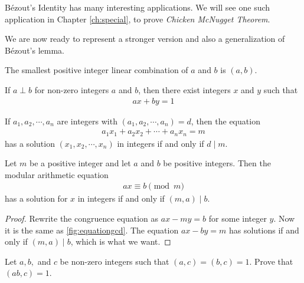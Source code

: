 \documentclass{subfile}
\begin{document}
	B\'{e}zout's Identity has many interesting applications. We will see one such application in Chapter \ref{ch:special}, to prove \textit{Chicken McNugget Theorem}.

	We are now ready to represent a stronger version and also a generalization of B\'{e}zout's lemma.

	\begin{corollary}   \label{cor:strongbezout}
		The smallest positive integer linear combination of $a$ and $b$ is $(a,b)$.
	\end{corollary}

	\begin{corollary}  \label{cor:bezoutcoprime}
		If $a \perp b$ for non-zero integers $a$ and $b$, then there exist integers $x$ and $y$ such that
		\begin{align*}
		ax+by=1
		\end{align*}
	\end{corollary}

	\begin{theorem} 
		If $a_1, a_2, \cdots, a_n$ are integers with $(a_1, a_2, \cdots, a_n)=d$, then the equation
		\begin{align*}
		a_1x_1 + a_2x_2 + \cdots + a_n x_n = m
		\end{align*}
		has a solution $(x_1, x_2, \cdots, x_n)$ in integers if and only if $d\mid m$.
	\end{theorem}

	\begin{theorem}\label{thm:ax=b}
		Let $m$ be a positive integer and let $a$ and $b$ be positive integers. Then the modular arithmetic equation
		\begin{align*} ax \equiv b \pmod m\end{align*}
		has a solution for $x$ in integers if and only if $(m,a)\mid b$.
	\end{theorem}

	\begin{proof}
		Rewrite the congruence equation as $ax-my = b$ for some integer $y$. Now it is the same as \autoref{fig:equationgcd}. The equation $ax-by=m$ has solutions if and only if $(m,a)\mid b$, which is what we want.
	\end{proof}

	\begin{problem}
		Let $a,b,$ and $c$ be non-zero integers such that $(a, c)=(b,c)=1$. Prove that $(ab,c)=1$.
	\end{problem}
\end{document}
